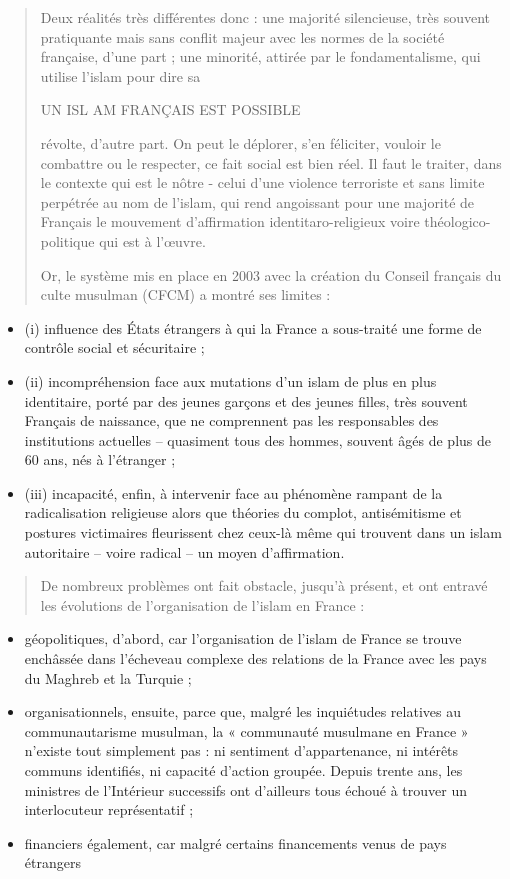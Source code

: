 \begin{quote}
Deux réalités très différentes donc : une majorité silencieuse, très
souvent pratiquante mais sans conflit majeur avec les normes de la
société française, d'une part ; une minorité, attirée par le
fondamentalisme, qui utilise l'islam pour dire sa

UN ISL AM FRANÇAIS EST POSSIBLE

révolte, d'autre part. On peut le déplorer, s'en féliciter, vouloir le
combattre ou le respecter, ce fait social est bien réel. Il faut le
traiter, dans le contexte qui est le nôtre - celui d'une violence
terroriste et sans limite perpétrée au nom de l'islam, qui rend
angoissant pour une majorité de Français le mouvement d'affirmation
identitaro-religieux voire théologico-politique qui est à l'œuvre.

Or, le système mis en place en 2003 avec la création du Conseil français
du culte musulman (CFCM) a montré ses limites :
\end{quote}

\begin{itemize}
\item
  (i) influence des États étrangers à qui la France a sous-traité une
  forme de contrôle social et sécuritaire ;
\item
  (ii) incompréhension face aux mutations d'un islam de plus en plus
  identitaire, porté par des jeunes garçons et des jeunes filles, très
  souvent Français de naissance, que ne comprennent pas les responsables
  des institutions actuelles -- quasiment tous des hommes, souvent âgés
  de plus de 60 ans, nés à l'étranger ;
\item
  (iii) incapacité, enfin, à intervenir face au phénomène rampant de la
  radicalisation religieuse alors que théories du complot, antisémitisme
  et postures victimaires fleurissent chez ceux-là même qui trouvent
  dans un islam autoritaire -- voire radical -- un moyen d'affirmation.
\end{itemize}

\begin{quote}
De nombreux problèmes ont fait obstacle, jusqu'à présent, et ont entravé
les évolutions de l'organisation de l'islam en France :
\end{quote}

\begin{itemize}
\item
  géopolitiques, d'abord, car l'organisation de l'islam de France se
  trouve enchâssée dans l'écheveau complexe des relations de la France
  avec les pays du Maghreb et la Turquie ;
\item
  organisationnels, ensuite, parce que, malgré les inquiétudes relatives
  au communautarisme musulman, la « communauté musulmane en France »
  n'existe tout simplement pas : ni sentiment d'appartenance, ni
  intérêts communs identifiés, ni capacité d'action groupée. Depuis
  trente ans, les ministres de l'Intérieur successifs ont d'ailleurs
  tous échoué à trouver un interlocuteur représentatif ;
\item
  financiers également, car malgré certains financements venus de pays
  étrangers
\end{itemize}

